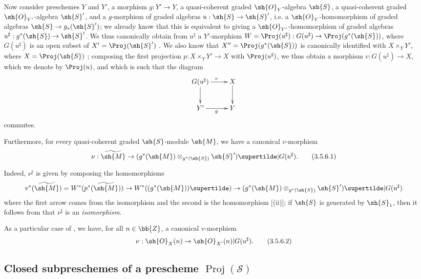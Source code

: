 \begin{env}[3.5.6]
\label{II.3.5.6}
Now consider preschemes $Y$ and $Y'$, a morphism $g:Y'\to Y$, a quasi-coherent graded $\sh{O}_Y$-algebra $\sh{S}$, a quasi-coherent graded $\sh{O}_{Y'}$-algebra $\sh{S}'$, and a $g$-morphism of graded algebras $u:\sh{S}\to\sh{S}'$, i.e. a $\sh{O}_Y$-homomorphism of graded algebras $\sh{S}\to g_*(\sh{S}')$;
we already know that this is equivalent to giving a $\sh{O}_{Y'}$-homomorphism of graded algebras $u^\sharp:g^*(\sh{S})\to\sh{S}'$.
We thus canonically obtain from $u^\sharp$ a $Y'$-morphism $W=\Proj(u^\sharp):G(u^\sharp)\to\Proj(g^*(\sh{S}))$, where $G(u^\sharp)$ is an open subset of $X'=\Proj(\sh{S}')$ .
We also know that $X''=\Proj(g^*(\sh{S}))$ is canonically identified with $X\times_Y Y'$, where $X=\Proj(\sh{S})$ ;
composing the first projection $p:X\times_Y Y'\to X$ with $\Proj(u^\sharp)$, we thus obtain a morphism $v:G(u^\sharp)\to X$, which we denote by $\Proj(u)$, and which is such that the diagram
\[
  \xymatrix{
    G(u^\sharp) \ar[r]^{v} \ar[d]
    & X \ar[d]
  \\Y' \ar[r]_{g}
    & Y
  }
\]
commutes.

Furthermore, for every quasi-coherent graded $\sh{S}$-module $\sh{M}$, we have a canonical $v$-morphism
\[
\label{II.3.5.6.1}
  \nu : \widetilde{\sh{M}} \to (g^*(\sh{M})\otimes_{g^*(\sh{S})}\sh{S}')\supertilde|G(u^\sharp).
\tag{3.5.6.1}
\]

Indeed, $\nu^\sharp$ is given by composing the homomorphisms
\[
  v^*(\widetilde{\sh{M}})
  = W^*(p^*(\widetilde{\sh{M}}))
  \to W^*((g^*(\sh{M}))\supertilde)
  \to (g^*(\sh{M})\otimes_{g^*(\sh{S})}\sh{S}')\supertilde|G(u^\sharp)
\]
where the first arrow comes from the isomorphism  and the second is the homomorphism [(ii)];
if $\sh{S}$ is generated by $\sh{S}_1$, then it follows from  that $\nu^\sharp$ is an \emph{isomorphism}.

As a particular case of , we have, for all $n\in\bb{Z}$, a canonical $v$-morphism
\[
\label{II.3.5.6.2}
  \nu : \sh{O}_X(n) \to \sh{O}_{X'}(n)|G(u^\sharp).
\tag{3.5.6.2}
\]
\end{env}


\subsection{Closed subpreschemes of a prescheme $\operatorname{Proj}(\mathcal{S})$}
\label{subsection:II.3.6}

